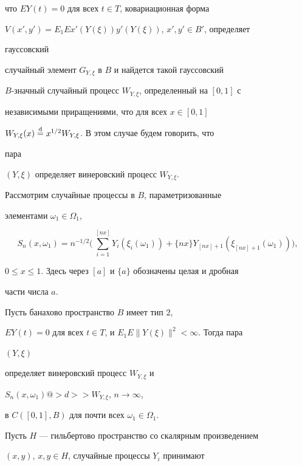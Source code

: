 что $EY(t)=0$ для всех $t\in T$, ковариационная форма 


$V(x',y')=E_1Ex'(Y(\xi))y'(Y(\xi))$, $x',y'\in B'$, определяет 


гауссовский 


случайный элемент $G_{Y,\xi}$ в $B$ и найдется такой гауссовский 


$B$-значный случайный процесс $W_{Y,\xi}$, определенный на $[0,1]$ с 


независимыми приращениями, что для всех $x\in[0,1]$\; 


$W_{Y,\xi}(x)\overset{\mathrm{d}}{=}{} x^{1/2}W_{Y,\xi}$. В этом случае будем говорить, что 


пара 


$(Y,\xi)$ определяет винеровский процесс $W_{Y,\xi}$. 


 


Рассмотрим случайные процессы в $B$, параметризованные 


элементами $\omega_1\in\Omega_1$, 


$$ 


S_n(x,\omega_1)=n^{-1/2}\bigg(\, 


\sum^{[nx]}_{i=1}Y_i(\xi_i(\omega_1))+\{nx\} 


Y_{[nx]+1}(\xi_{[nx]+1}(\omega_1))\bigg), 


$$ 


$0\le x\le 1$. Здесь через $[a]$ и $\{a\}$ обозначены целая и дробная 


части числа $a$. 


 


\begin{thm} Пусть банахово пространство $B$ имеет тип $2$, 


$EY(t)=0$ для всех $t\in T$, и $E_1E\|Y(\xi)\|^2<\infty$. Тогда пара 


$(Y,\xi)$ 


определяет винеровский процесс $W_{Y,\xi}$ и 


$S_n(x,\omega_1)@>d>> W_{Y,\xi}$, $n\to\infty$, 


в $C([0,1],B)$ для почти всех $\omega_1\in\Omega_1$. 


\end{thm} 


 


Пусть $H$ --- гильбертово пространство со скалярным произведением 


$(x,y)$, $x,y\in H$, случайные процессы $Y_i$ принимают 



